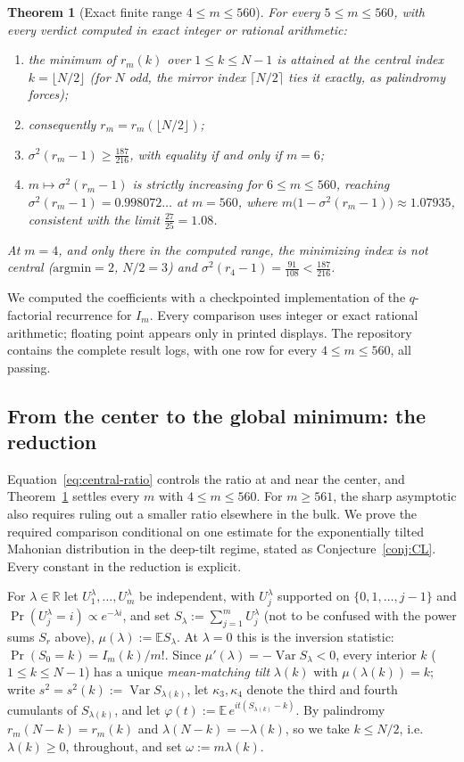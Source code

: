 \documentclass[11pt]{amsart}
\theoremstyle{plain}
\newtheorem{theorem}{Theorem}[section]
\theoremstyle{definition}
\theoremstyle{remark}
\DeclareMathOperator{\Var}{Var}
\begin{document}
\begin{theorem}[Exact finite range $4\le m\le560$]
\label{thm:finite560}
For every $5\le m\le560$, with every verdict computed in exact integer or
rational arithmetic:
\begin{enumerate}[label=(\roman*)]
\item the minimum of $r_m(k)$ over $1\le k\le N-1$ is attained at the
central index $k=\lfloor N/2\rfloor$ (for $N$ odd, the mirror index
$\lceil N/2\rceil$ ties it exactly, as palindromy forces);
\item consequently $r_m=r_m(\lfloor N/2\rfloor)$;
\item $\sigma^2(r_m-1)\ge\tfrac{187}{216}$, with equality if and only if
$m=6$;
\item $m\mapsto\sigma^2(r_m-1)$ is strictly increasing for $6\le m\le560$,
reaching $\sigma^2(r_m-1)=0.998072\ldots$ at $m=560$, where
$m\bigl(1-\sigma^2(r_m-1)\bigr)\approx1.07935$, consistent with the limit
$\tfrac{27}{25}=1.08$.
\end{enumerate}
At $m=4$, and only there in the computed range, the minimizing index is
not central ($\mathrm{argmin}=2$, $N/2=3$) and
$\sigma^2(r_4-1)=\tfrac{91}{108}<\tfrac{187}{216}$.
\end{theorem}

We computed the coefficients with a checkpointed implementation of the
$q$-factorial recurrence for $I_m$. Every comparison uses integer or exact
rational arithmetic; floating point appears only in printed displays. The
repository contains the complete result logs, with one row for every
$4\le m\le560$, all passing.

\subsection*{From the center to the global minimum: the reduction}
Equation~\eqref{eq:central-ratio} controls the ratio at and near the center,
and Theorem~\ref{thm:finite560} settles every $m$ with $4\le m\le560$. For
$m\ge561$, the sharp asymptotic also requires ruling out a smaller ratio
elsewhere in the bulk. We prove the required comparison conditional on one
estimate for the exponentially tilted Mahonian distribution in the
deep-tilt regime, stated as Conjecture~\ref{conj:CL}. Every constant in the
reduction is explicit.

For $\lambda\in\mathbb R$ let $U^\lambda_1,\dots,U^\lambda_m$ be
independent, with $U^\lambda_j$ supported on $\{0,1,\dots,j-1\}$ and
$\Pr(U^\lambda_j=i)\propto e^{-\lambda i}$, and set
$S_\lambda:=\sum_{j=1}^m U^\lambda_j$ (not to be confused with the power
sums $S_r$ above), $\mu(\lambda):=\mathbb E S_\lambda$.
At $\lambda=0$ this is the inversion statistic:
$\Pr(S_0=k)=I_m(k)/m!$. Since $\mu'(\lambda)=-\Var S_\lambda<0$, every
interior $k$ ($1\le k\le N-1$) has a unique \emph{mean-matching tilt}
$\lambda(k)$ with $\mu(\lambda(k))=k$; write
$s^2=s^2(k):=\Var S_{\lambda(k)}$, let $\kappa_3,\kappa_4$ denote the
third and fourth cumulants of $S_{\lambda(k)}$, and let
$\varphi(t):=\mathbb E\,e^{it(S_{\lambda(k)}-k)}$. By palindromy
$r_m(N-k)=r_m(k)$ and $\lambda(N-k)=-\lambda(k)$, so we take $k\le N/2$,
i.e.\ $\lambda(k)\ge0$, throughout, and set $\omega:=m\lambda(k)$.
\end{document}
